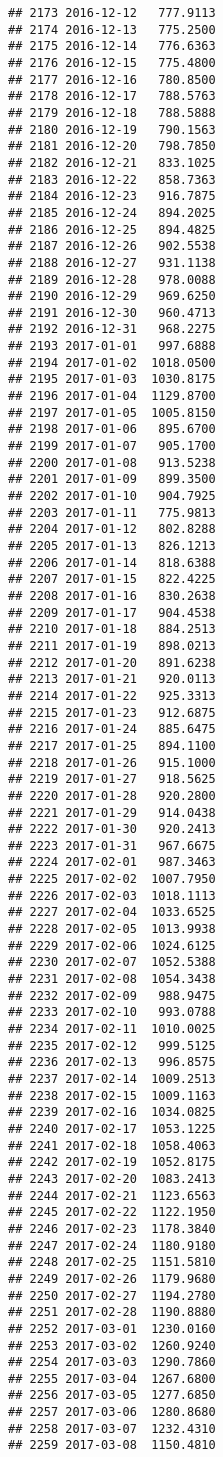 \documentclass[
]{article}
\begin{document}
\begin{verbatim}
## 2173 2016-12-12   777.9113
## 2174 2016-12-13   775.2500
## 2175 2016-12-14   776.6363
## 2176 2016-12-15   775.4800
## 2177 2016-12-16   780.8500
## 2178 2016-12-17   788.5763
## 2179 2016-12-18   788.5888
## 2180 2016-12-19   790.1563
## 2181 2016-12-20   798.7850
## 2182 2016-12-21   833.1025
## 2183 2016-12-22   858.7363
## 2184 2016-12-23   916.7875
## 2185 2016-12-24   894.2025
## 2186 2016-12-25   894.4825
## 2187 2016-12-26   902.5538
## 2188 2016-12-27   931.1138
## 2189 2016-12-28   978.0088
## 2190 2016-12-29   969.6250
## 2191 2016-12-30   960.4713
## 2192 2016-12-31   968.2275
## 2193 2017-01-01   997.6888
## 2194 2017-01-02  1018.0500
## 2195 2017-01-03  1030.8175
## 2196 2017-01-04  1129.8700
## 2197 2017-01-05  1005.8150
## 2198 2017-01-06   895.6700
## 2199 2017-01-07   905.1700
## 2200 2017-01-08   913.5238
## 2201 2017-01-09   899.3500
## 2202 2017-01-10   904.7925
## 2203 2017-01-11   775.9813
## 2204 2017-01-12   802.8288
## 2205 2017-01-13   826.1213
## 2206 2017-01-14   818.6388
## 2207 2017-01-15   822.4225
## 2208 2017-01-16   830.2638
## 2209 2017-01-17   904.4538
## 2210 2017-01-18   884.2513
## 2211 2017-01-19   898.0213
## 2212 2017-01-20   891.6238
## 2213 2017-01-21   920.0113
## 2214 2017-01-22   925.3313
## 2215 2017-01-23   912.6875
## 2216 2017-01-24   885.6475
## 2217 2017-01-25   894.1100
## 2218 2017-01-26   915.1000
## 2219 2017-01-27   918.5625
## 2220 2017-01-28   920.2800
## 2221 2017-01-29   914.0438
## 2222 2017-01-30   920.2413
## 2223 2017-01-31   967.6675
## 2224 2017-02-01   987.3463
## 2225 2017-02-02  1007.7950
## 2226 2017-02-03  1018.1113
## 2227 2017-02-04  1033.6525
## 2228 2017-02-05  1013.9938
## 2229 2017-02-06  1024.6125
## 2230 2017-02-07  1052.5388
## 2231 2017-02-08  1054.3438
## 2232 2017-02-09   988.9475
## 2233 2017-02-10   993.0788
## 2234 2017-02-11  1010.0025
## 2235 2017-02-12   999.5125
## 2236 2017-02-13   996.8575
## 2237 2017-02-14  1009.2513
## 2238 2017-02-15  1009.1163
## 2239 2017-02-16  1034.0825
## 2240 2017-02-17  1053.1225
## 2241 2017-02-18  1058.4063
## 2242 2017-02-19  1052.8175
## 2243 2017-02-20  1083.2413
## 2244 2017-02-21  1123.6563
## 2245 2017-02-22  1122.1950
## 2246 2017-02-23  1178.3840
## 2247 2017-02-24  1180.9180
## 2248 2017-02-25  1151.5810
## 2249 2017-02-26  1179.9680
## 2250 2017-02-27  1194.2780
## 2251 2017-02-28  1190.8880
## 2252 2017-03-01  1230.0160
## 2253 2017-03-02  1260.9240
## 2254 2017-03-03  1290.7860
## 2255 2017-03-04  1267.6800
## 2256 2017-03-05  1277.6850
## 2257 2017-03-06  1280.8680
## 2258 2017-03-07  1232.4310
## 2259 2017-03-08  1150.4810

\end{verbatim}
\end{document}
